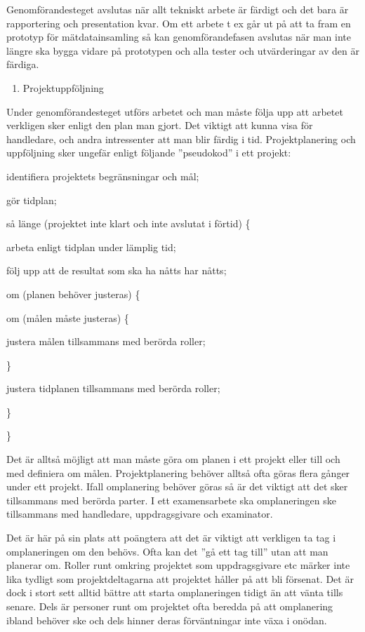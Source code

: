 Genomförandesteget avslutas när allt tekniskt arbete är färdigt och det
bara är rapportering och presentation kvar. Om ett arbete t ex går ut på
att ta fram en prototyp för mätdatainsamling så kan genomförandefasen
avslutas när man inte längre ska bygga vidare på prototypen och alla
tester och utvärderingar av den är färdiga.

\begin{enumerate}
\def\labelenumi{\arabic{enumi}.}
\item
  \protect\hypertarget{_Ref148099069}{}{}Projektuppföljning
\end{enumerate}

Under genomförandesteget utförs arbetet och man måste följa upp att
arbetet verkligen sker enligt den plan man gjort. Det viktigt att kunna
visa för handledare, och andra intressenter att man blir färdig i tid.
Projektplanering och uppföljning sker ungefär enligt följande
''pseudokod'' i ett projekt:

identifiera projektets begränsningar och mål;

gör tidplan;

så länge (projektet inte klart och inte avslutat i förtid) \{

arbeta enligt tidplan under lämplig tid;

följ upp att de resultat som ska ha nåtts har nåtts;

om (planen behöver justeras) \{

om (målen måste justeras) \{

justera målen tillsammans med berörda roller;

\}

justera tidplanen tillsammans med berörda roller;

\}

\}

Det är alltså möjligt att man måste göra om planen i ett projekt eller
till och med definiera om målen. Projektplanering behöver alltså ofta
göras flera gånger under ett projekt. Ifall omplanering behöver göras så
är det viktigt att det sker tillsammans med berörda parter. I ett
examensarbete ska omplaneringen ske tillsammans med handledare,
uppdragsgivare och examinator.

Det är här på sin plats att poängtera att det är viktigt att verkligen
ta tag i omplaneringen om den behövs. Ofta kan det ''gå ett tag till''
utan att man planerar om. Roller runt omkring projektet som
uppdragsgivare etc märker inte lika tydligt som projektdeltagarna att
projektet håller på att bli försenat. Det är dock i stort sett alltid
bättre att starta omplaneringen tidigt än att vänta tills senare. Dels
är personer runt om projektet ofta beredda på att omplanering ibland
behöver ske och dels hinner deras förväntningar inte växa i onödan.

